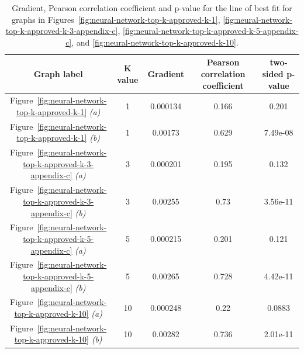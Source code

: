 \begin{table}[H]
    \centering
    \begin{tabular}{@{}c c c c c@{}} 
    \hline
    \textbf{Graph label} & \textbf{K value} & \textbf{Gradient} & \textbf{Pearson correlation coefficient} & \textbf{two-sided p-value} \\
    \hline
Figure~\ref{fig:neural-network-top-k-approved-k-1} \emph{(a)} & 1 & 0.000134 & 0.166 & 0.201 \\
Figure~\ref{fig:neural-network-top-k-approved-k-1} \emph{(b)} & 1 & 0.00173 & 0.629 & 7.49e-08 \\
Figure~\ref{fig:neural-network-top-k-approved-k-3-appendix-c} \emph{(a)} & 3 & 0.000201 & 0.195 & 0.132 \\
Figure~\ref{fig:neural-network-top-k-approved-k-3-appendix-c} \emph{(b)} & 3 & 0.00255 & 0.73 & 3.56e-11 \\
Figure~\ref{fig:neural-network-top-k-approved-k-5-appendix-c} \emph{(a)} & 5 & 0.000215 & 0.201 & 0.121 \\
Figure~\ref{fig:neural-network-top-k-approved-k-5-appendix-c} \emph{(b)} & 5 & 0.00265 & 0.728 & 4.42e-11 \\
Figure~\ref{fig:neural-network-top-k-approved-k-10} \emph{(a)} & 10 & 0.000248 & 0.22 & 0.0883 \\
Figure~\ref{fig:neural-network-top-k-approved-k-10} \emph{(b)} & 10 & 0.00282 & 0.736 & 2.01e-11 \\
    \hline
    \end{tabular}
    \caption{Gradient, Pearson correlation coefficient and p-value for the line of best fit for graphs in Figures~\ref{fig:neural-network-top-k-approved-k-1}, \ref{fig:neural-network-top-k-approved-k-3-appendix-c}, \ref{fig:neural-network-top-k-approved-k-5-appendix-c}, and \ref{fig:neural-network-top-k-approved-k-10}.}
    \label{table:neural-network-top-k-line-of-best-fit-for-approved}
\end{table}

